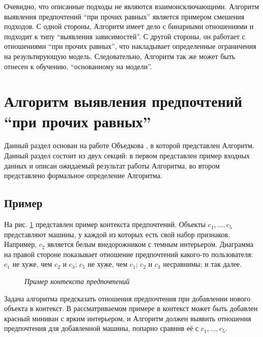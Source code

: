 		Очевидно, что описанные подходы не являются взаимоисключающими. Алгоритм выявления предпочтений \enquote{при прочих равных} является примером смешения подходов. С одной стороны, Алгоритм имеет дело с бинарными отношениями и подходит к типу ``выявления зависимостей''. С другой стороны, он работает с отношениями \enquote{при прочих равных}, что накладывает определенные ограничения на результирующую модель. Следовательно, Алгоритм так же может быть отнесен к обучению, ``основанному на модели''.
	
	
\section[Алгоритм выявления предпочтений \enquote{при прочих равных}]{ Алгоритм выявления предпочтений \\ \enquote{при прочих равных}}

	Данный раздел основан на работе Объедкова \cite{Obiedkov:2013}, в которой представлен Алгоритм. Данный раздел состоит из двух секций: в первом представлен пример входных данных и описан ожидаемый результат работы Алгоритма, во втором представлено формальное определение Алгоритма.
	
	\subsection{Пример}
	\label{subsection:example}
		На рис. \ref{fig:pcxt} представлен пример контекста предпочтений. Объекты $c_1, \dotsc, c_5$ представляют машины, у каждой из которых есть свой набор признаков. Например, $c_2$ является белым внедорожником с темным интерьером. Диаграмма на правой стороне показывает отношение предпочтений какого-то пользователя: $c_1$ не хуже, чем $c_2$ и $c_3$; $c_5$ не хуже, чем $c_1$; $c_2$ и $c_3$ несравнимы; и так далее. 
		\begin{figure}
			\begin{center} 
				\cars \prefs
				\caption{\it Пример контекста предпочтений \cite[Рис.~1.1]{Obiedkov:2013}}
				\label{fig:pcxt}	
			\end{center} 
		\end{figure} 
		
		Задача алгоритма предсказать отношения предпочтения при добавлении нового объекта в контекст. В рассматриваемом примере в контекст может быть добавлен красный миниван с ярким интерьером, и Алгоритм должен выявить отношения предпочтения для добавленной машины, попарно сравнив её с $c_1, \dotsc, c_5$. 
	

